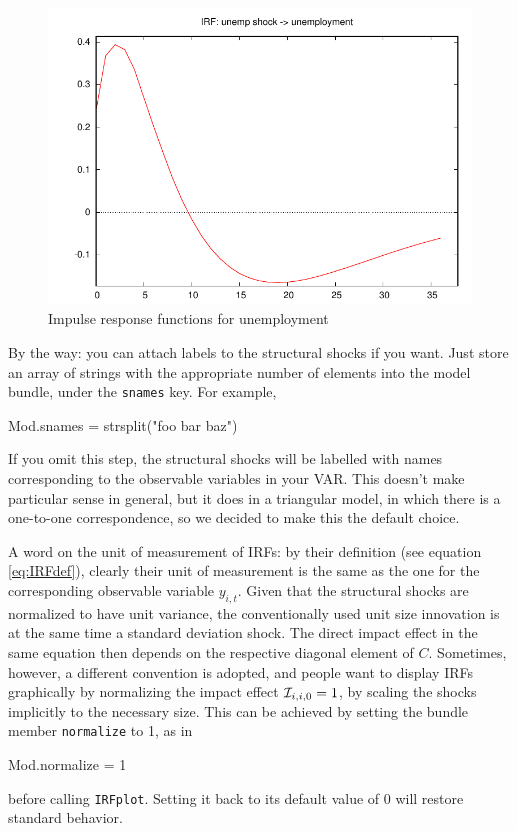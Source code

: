 \documentclass[a4paper,10pt]{article}
\newcommand{\cmd}[1]{\texttt{#1}}
\newcommand{\IRF}[1]{\ensuremath \mathcal{I}_{#1}}
\begin{document}
\begin{figure}[htbp]
  \centering
    \includegraphics[scale=0.7]{simpleC_11_noboot}
  \caption{Impulse response functions for unemployment}
  \label{fig:simpleC-noboot.IRF}
\end{figure}

By the way: you can attach labels to the structural shocks if you
want. Just store an array of strings with the appropriate number of
elements into the model bundle, under the \texttt{snames} key. For
example,
\begin{code}
  Mod.snames = strsplit("foo bar baz")
\end{code}
If you omit this step, the structural shocks will be labelled with
names corresponding to the observable variables in your VAR. This
doesn't make particular sense in general, but it does in a triangular
model, in which there is a one-to-one correspondence, so we decided to
make this the default choice.

A word on the unit of measurement of IRFs: by their definition (see
equation \eqref{eq:IRFdef}), clearly their unit of measurement is
the same as the one for the corresponding observable variable
$y_{i,t}$. 
Given that the structural shocks are normalized to have unit 
variance, the conventionally used unit size innovation is at the same
time a standard deviation shock. The direct impact effect in the same 
equation then depends on the respective diagonal element of $C$.
Sometimes, however, a different convention is adopted, and
people want to display IRFs graphically by normalizing the impact 
effect $\IRF{i,i,0} =
1$, by scaling the shocks implicitly to the necessary size. 
This can be achieved by setting the bundle member \cmd{normalize}
to 1, as in
\begin{code}
  Mod.normalize = 1
\end{code}
before calling \cmd{IRFplot}. Setting it back to its default value of
0 will restore standard behavior.
\end{document}
